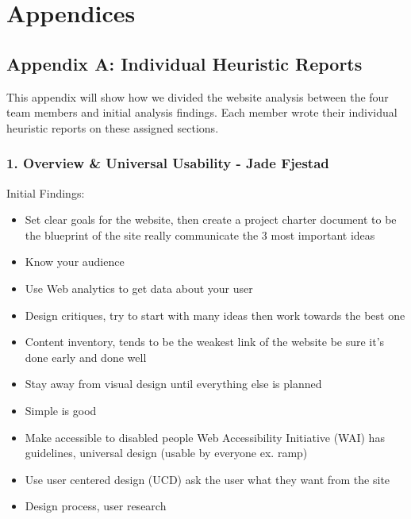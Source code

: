 \documentclass[12pt]{article}
\begin{document}
\newpage \section{Appendices}
\subsection*{Appendix A: Individual Heuristic Reports}
This appendix will show how we divided the website analysis between the four team members and initial analysis findings. Each member wrote their individual heuristic reports on these assigned sections.

\subsubsection*{1. Overview \& Universal Usability - Jade Fjestad}

Initial Findings:
\begin{itemize}
\item Set clear goals for the website, then create a project charter document to be the blueprint of the site
really communicate the 3 most important ideas
\item Know your audience 
\item Use Web analytics to get data about your user
\item Design critiques, try to start with many ideas then work towards the best one
\item Content inventory, tends to be the weakest link of the website be sure it’s done early and done well
\item Stay away from visual design until everything else is planned
\item Simple is good

\item Make accessible to disabled people Web Accessibility Initiative (WAI) has guidelines, universal design (usable by everyone ex. ramp)
\item Use user centered design (UCD) ask the user what they want from the site
\item Design process, user research 
\end{itemize}
\end{document}
